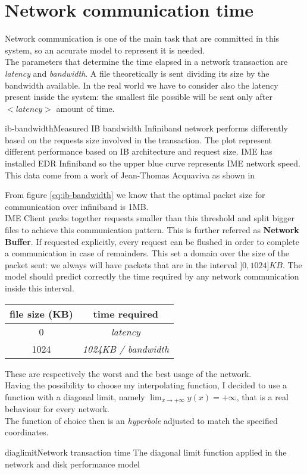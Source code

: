 \section{Network communication time}\label{netbuff}
Network communication is one of the main task that are committed in this system,
so an accurate model to represent it is needed. \\
The parameters that determine the time elapsed in a network transaction are
\textit{latency} and \textit{bandwidth}. A file theoretically is sent dividing
its size by the bandwidth available. In the real world we have to consider also
the latency present inside the system: the smallest file possible will be sent
only after $<latency>$ amount of time. \\
\begin{myimage}{ib-bandwidth}{Measured IB bandwidth}
    Infiniband network performs differently based on the requests size involved
    in the transaction. The plot represent different performance based on IB
    architecture and request size. IME has installed EDR Infiniband so the upper
    blue curve represents IME network speed. This data come from a work of
    Jean-Thomas Acquaviva as shown in \cite{erasurecoding-pdf}
\end{myimage}

From figure \ref{eq:ib-bandwidth} we know that the optimal packet size for
communication over infiniband is 1MB. \\
IME Client packs together requests smaller than this threshold and split bigger
files to achieve this communication pattern. This is further referred as
\textbf{Network Buffer}.  If requested explicitly, every request can be flushed
in order to complete a communication in case of remainders.  This set a domain
over the size of the packet sent: we always will have packets that are in the
interval $]0, 1024] KB$. The model should predict correctly the time required by
any network communication inside this interval. \\

\vspace{0.5cm}
\begin{tabular}{c | c}
    file size (KB) & time required \\ \hline
    0 & \textit{latency} \\ \hline
    1024 & \textit{1024KB / bandwidth}
\end{tabular}
\vspace{0.5cm}

These are respectively the worst and the best usage of the network. \\
Having the possibility to choose my interpolating function, I decided to use a
function with a diagonal limit, namely $\lim_{x \to +\infty} y(x) = +\infty$,
that is a real behaviour for every network. \\
The function of choice then is an \textit{hyperbole} adjusted to match the
specified coordinates. \\
\begin{myimage}{diaglimit}{Network transaction time}
    The diagonal limit function applied in the network and disk performance model
\end{myimage}


